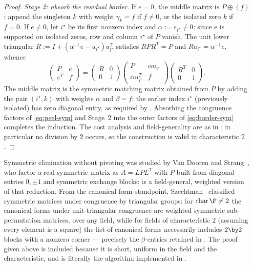 \begin{proof}
  \emph{Stage 2: absorb the residual border.}
  If $e = 0$, the middle matrix is $P \oplus (f)$: append the singleton $k$
  with weight $\gamma_k = f$ if $f \neq 0$, or the isolated zero $k$ if
  $f = 0$.  If $e \neq 0$, let $i^\star$ be its first nonzero index and
  $\alpha := e_{i^\star} \neq 0$; since $e$ is supported on isolated
  zeros, row and column $i^\star$ of $P$ vanish.  The unit lower triangular
  $R := I + (\alpha^{-1} e - u_{i^\star}) u_{i^\star}^T$ satisfies
  $R P R^T = P$ and $R u_{i^\star} = \alpha^{-1} e$, whence
  \[
    \begin{pmatrix}
      P & e\\
      e^T & f
    \end{pmatrix}
    =
    \begin{pmatrix}
      R & 0\\
      0 & 1
    \end{pmatrix}
    \begin{pmatrix}
      P & \alpha u_{i^\star}\\
      \alpha u_{i^\star}^T & f
    \end{pmatrix}
    \begin{pmatrix}
      R^T & 0\\
      0 & 1
    \end{pmatrix}.
  \]
  The middle matrix is the symmetric matching matrix obtained from $P$ by
  adding the pair $(i^\star, k)$ with weights $\alpha$ and $\beta = f$: the
  earlier index $i^\star$ (previously isolated) has zero diagonal entry, as
  required by .  Absorbing the congruence factors of
  \cref{eq:peel-sym} and Stage~2 into the outer factors of
  \cref{eq:border-sym} completes the induction.  The cost analysis and
  field-generality are as in ; in particular no
  division by $2$ occurs, so the construction is valid in characteristic
  $2$.
\end{proof}

\begin{remark}\label{rem:known-forms}
  Symmetric elimination without pivoting was studied by Van Dooren and
  Strang~\cite{vandooren_strang_2014}, who factor a real symmetric matrix
  as $A = LPL^T$ with $P$ built from diagonal entries $0, \pm 1$ and
  symmetric exchange blocks;  is a field-general,
  weighted version of that reduction.  From the canonical-form standpoint,
  Szechtman~\cite{szechtman_2007} classified symmetric matrices under
  congruence by triangular groups: for $\operatorname{char} \F \neq 2$ the
  canonical forms under unit-triangular congruence are weighted symmetric
  sub-permutation matrices, over any field, while for fields of
  characteristic $2$ (assuming every element is a square) the list of
  canonical forms necessarily includes $2 \by 2$ blocks with a nonzero
  corner --- precisely the $\beta$-entries retained in
  .  The proof given above is included because it is
  short, uniform in the field and the characteristic, and is literally the
  algorithm implemented in .
\end{remark}

